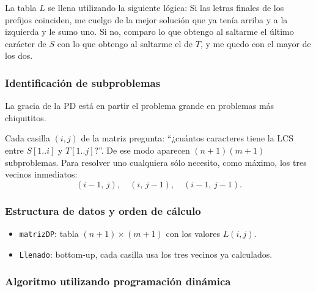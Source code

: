 La tabla \(L\) se llena utilizando la siguiente lógica: Si las letras finales de los prefijos coinciden, me cuelgo de la mejor
solución que ya tenía arriba y a la izquierda y le sumo uno.  
Si no, comparo lo que obtengo al saltarme el último carácter de \(S\) con lo que obtengo al saltarme el de \(T\), y me quedo con el mayor de los dos.

\subsubsection{Identificación de subproblemas}

La gracia de la PD está en partir el problema grande en problemas más chiquititos.

Cada casilla \((i,j)\) de la matriz pregunta: “¿cuántos caracteres tiene la LCS entre \(S[1..i]\) y \(T[1..j]\)?”.
De ese modo aparecen \((n+1)(m+1)\) subproblemas. Para resolver uno cualquiera sólo necesito, como máximo, los tres vecinos
inmediatos: \[(i{-}1,\,j),\quad(i,\,j{-}1),\quad(i{-}1,\,j{-}1).\]

\subsubsection{Estructura de datos y orden de cálculo}

\begin{itemize}
  \item \texttt{matrizDP}: tabla \((n{+}1)\times(m{+}1)\) con los valores \(L(i,j)\).
  \item \texttt{Llenado}: bottom-up, cada casilla usa los tres vecinos ya calculados.
\end{itemize}

\subsubsection{Algoritmo utilizando programación dinámica \cite{GfG2025LCS} \cite{CLRS2009DP}}

